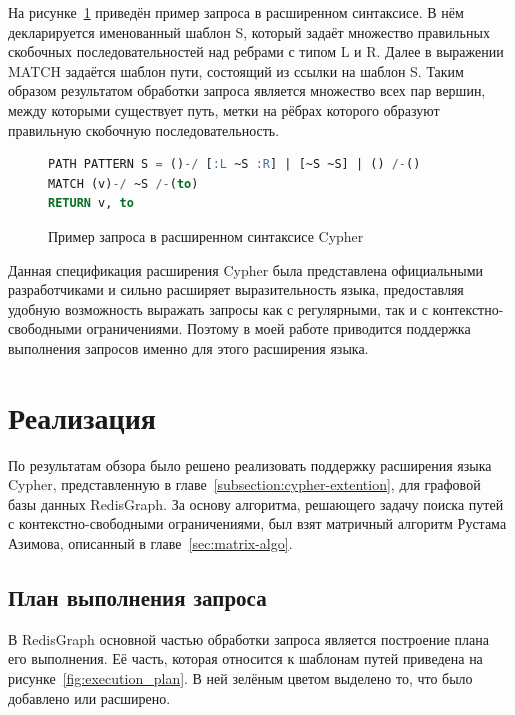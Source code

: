 \documentclass[14pt]{matmex-diploma-custom}
\newcommand{\gsv}[1]{\textcolor{red}{#1$^{\text{gsv}}$}}
\begin{document}
На рисунке~\ref{code:cypher_query_3} приведён пример запроса в расширенном синтаксисе. В нём декларируется именованный шаблон S, который задаёт множество правильных скобочных последовательностей над ребрами с типом L и R. Далее в выражении MATCH задаётся шаблон пути, состоящий из ссылки на шаблон S. Таким образом результатом обработки запроса является множество всех пар вершин, между которыми существует путь, метки на рёбрах которого образуют правильную скобочную последовательность. 



\begin{figure}[h!]
\begin{lstlisting}[language=sql]
PATH PATTERN S = ()-/ [:L ~S :R] | [~S ~S] | () /-()
MATCH (v)-/ ~S /-(to)
RETURN v, to
\end{lstlisting}
\caption{Пример запроса в расширенном синтаксисе Cypher}
\label{code:cypher_query_3}
\end{figure}

Данная спецификация расширения Cypher была представлена официальными разработчиками и сильно расширяет выразительность языка, предоставляя удобную возможность выражать запросы как с регулярными, так и с контекстно-свободными ограничениями. Поэтому в моей работе приводится поддержка выполнения запросов именно для этого расширения языка.


\section{Реализация}
По результатам обзора было решено реализовать поддержку расширения языка Cypher, представленную в главе~\ref{subsection:cypher-extention}, для графовой базы данных RedisGraph. За основу алгоритма, решающего задачу поиска путей с контекстно-свободными ограничениями, был взят матричный алгоритм Рустама Азимова, описанный в главе~\ref{sec:matrix-algo}.


\subsection{План выполнения запроса}\label{execution-plan}
В RedisGraph основной частью обработки запроса является построение плана его выполнения. Её часть, которая относится к шаблонам путей приведена на рисунке~\ref{fig:execution_plan}. В ней зелёным цветом выделено то, что было добавлено или расширено.
\end{document}
